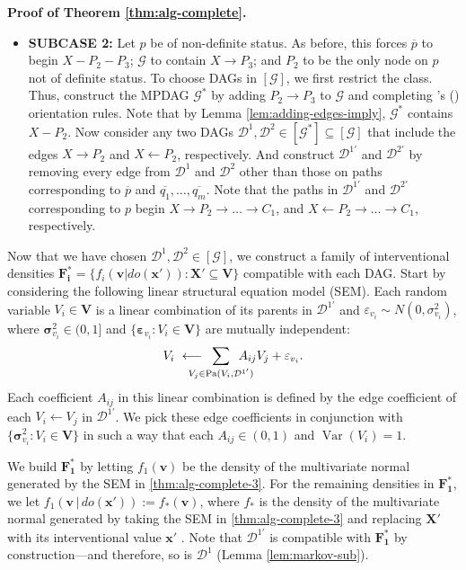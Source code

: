 \documentclass[11pt]{article}
\DeclareMathOperator{\Var}{Var}
\DeclareMathOperator{\Pa}{Pa}
\newcommand{\mb}[1]{\mathbf{#1}}
\newcommand{\g}[1][G]{\mathcal{#1}}
\newenvironment{proofofnoqed}[1][]{\noindent \textbf{Proof of #1.}}{}
\begin{document}
\begin{proofofnoqed}[Theorem \ref{thm:alg-complete}]
\begin{itemize}
        \item \textbf{SUBCASE 2:}
        Let $p$ be of non-definite status. As before, this forces $\overline{p}$ to begin $X - P_2 - P_3$; $\g$ to contain $X \to P_3$; and $P_2$ to be the only node on $p$ not of definite status. To choose DAGs in $[\g]$, we first restrict the class. Thus, construct the MPDAG $\g^*$ by adding $P_2 \to P_3$ to $\g$ and completing \citeauthor{meek1995causal}'s (\citeyear{meek1995causal}) orientation rules. Note that by Lemma \ref{lem:adding-edges-imply}, $\g^*$ contains $X - P_2$. Now consider any two DAGs $\g[D]^1, \g[D]^2 \in [\g^*] \subseteq [\g]$ that include the edges $X \to P_2$ and $X \gets P_2$, respectively. And construct $\g[D]^{1'}$ and $\g[D]^{2'}$ by removing every edge from $\g[D]^1$ and $\g[D]^2$ other than those on paths corresponding to $\overline{p}$ and $\overline{q_1}, \dots, \overline{q_m}$. Note that the paths in $\g[D]^{1'}$ and $\g[D]^{2'}$ corresponding to $p$ begin $X \to P_2 \to \dots \to C_1$, and $X \gets P_2 \to \dots \to C_1$, respectively.
    \end{itemize}
    
    Now that we have chosen $\g[D]^1, \g[D]^2 \in [\g]$, we construct a family of interventional densities $\mb{F^*_i} = \{ f_i(\mb{v}|do(\mb{x'})) : \mb{X'} \subseteq \mb{V} \}$ compatible with each DAG. Start by considering the following linear structural equation model (SEM). Each random variable $V_i \in \mb{V}$ is a linear combination of its parents in $\g[D]^{1'}$ and $\varepsilon_{v_i} \sim N(0, \sigma^2_{v_i})$, where $\mb{\sigma}^2_{v_i} \in (0,1]$ and $\{\mb{\varepsilon}_{v_i}: V_i \in \mb{V}\}$ are mutually independent:
    \begin{align}
    \label{thm:alg-complete-3}
        V_i \ \longleftarrow \mspace{-25mu} \sum_{V_j \in \Pa(V_i, \g[D]^{1'})} \mspace{-25mu} A_{ij} V_j + \varepsilon_{v_i}.
    \end{align}
    Each coefficient $A_{ij}$ in this linear combination is defined by the edge coefficient of each $V_i \gets V_j$ in $\g[D]^{1'}$. We pick these edge coefficients in conjunction with $\{\mb{\sigma}^2_{v_i}: V_i \in \mb{V}\}$ in such a way that each $A_{ij} \in (0,1)$ and $\Var(V_i)=1$. 

    We build $\mb{F^*_1}$ by letting $f_1(\mb{v})$ be the density of the multivariate normal generated by the SEM in \eqref{thm:alg-complete-3}. For the remaining densities in $\mb{F^*_1}$, we let $f_1(\mb{v} \,|\, do(\mb{x'})) := f_*(\mb{v})$, where $f_*$ is  the density of the multivariate normal generated by taking the SEM in \eqref{thm:alg-complete-3} and replacing $\mb{X'}$ with its interventional value $\mb{x'}$ \citep{pearl2009causality}. Note that $\g[D]^{1'}$ is compatible with $\mb{F^*_1}$ by construction---and therefore, so is $\g[D]^1$ (Lemma \ref{lem:markov-sub}).


\end{proofofnoqed}
\end{document}
